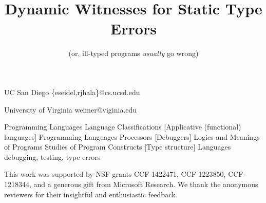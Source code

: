 \documentclass[9pt,numbers,preprint]{sigplanconf}
\theoremstyle{plain}%
\theoremstyle{definition}
\newcommand{\isTechReport}{false} %
\newcommand\includeTechReport[1]{%
  \ifthenelse{\equal{\isTechReport}{true}}
    {{#1}}
    {\ignorespaces}
\xspace}
\begin{document}
\toappear{}

\title{Dynamic Witnesses for Static Type Errors}

\subtitle{(or, ill-typed programs \emph{usually} go wrong)}

           {UC San Diego}
           {\{eseidel,rjhala\}@cs.ucsd.edu}

           {University of Virginia}
           {weimer@viginia.edu}

\maketitle





         {Programming Languages}
         {Language Classifications}
         [Applicative (functional) languages]
         {Programming Languages}
         {Processors}
         [Debuggers]
         {Logics and Meanings of Programs}
         {Studies of Program Constructs}
         [Type structure]
\terms
Languages
\keywords
debugging, testing, type errors






% 
% 

% 

\acks
%
This work was supported by NSF grants CCF-1422471, CCF-1223850,
CCF-1218344, and a generous gift from Microsoft Research.
%
We thank the anonymous reviewers for their insightful and enthusiastic
feedback.

{


\balance
}

\includeTechReport
{

\clearpage
\appendix

%
}
\end{document}
